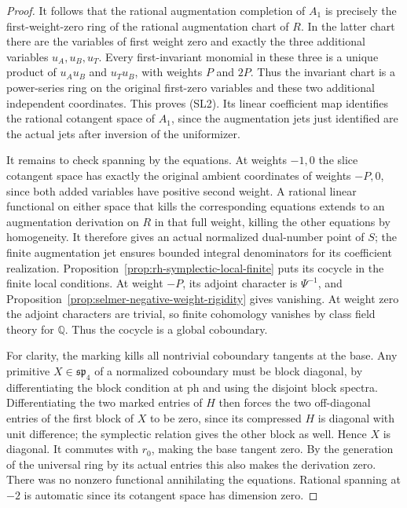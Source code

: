 \begin{proof}
It follows that the rational augmentation completion
of \(A_1\) is precisely the first-weight-zero ring
of the rational augmentation chart of \(R\).
In the latter chart there are the variables of
first weight zero and exactly the three additional
variables \(u_A,u_B,u_T\).
Every first-invariant monomial in these three is a
unique product of \(u_Au_B\) and \(u_Tu_B\), with
weights \(P\) and \(2P\).
Thus the invariant chart is a power-series ring on
the original first-zero variables and these two
additional independent coordinates. This proves (SL2).
Its linear coefficient map identifies the rational
cotangent space of \(A_1\), since the augmentation
jets just identified are the actual jets after
inversion of the uniformizer.

It remains to check spanning by the equations.
At weights \(-1,0\) the slice cotangent space
has exactly the original ambient coordinates of
weights \(-P,0\), since both added variables have
positive second weight. A rational linear functional
on either space that kills the corresponding equations
extends to an augmentation derivation on \(R\)
in that full weight, killing the other equations
by homogeneity. It therefore gives an actual normalized
dual-number point of \(S\); the finite augmentation
jet ensures bounded integral denominators for its
coefficient realization.
Proposition~\ref{prop:rh-symplectic-local-finite}
puts its cocycle in the finite local conditions.
At weight \(-P\), its adjoint character is
\(\Psi^{-1}\), and
Proposition~\ref{prop:selmer-negative-weight-rigidity}
gives vanishing. At weight zero the adjoint
characters are trivial, so finite cohomology
vanishes by class field theory for \(\mathbb Q\).
Thus the cocycle is a global coboundary.

For clarity, the marking kills all nontrivial
coboundary tangents at the base. Any primitive
\(X\in\mathfrak{sp}_4\) of a normalized
coboundary must be block diagonal, by differentiating
the block condition at \(\mathrm{ph}\) and using
the disjoint block spectra. Differentiating the two
marked entries of \(H\) then forces the two off-diagonal
entries of the first block of \(X\) to be zero,
since its compressed \(H\) is diagonal with
unit difference; the symplectic relation gives the
other block as well. Hence \(X\) is diagonal.
It commutes with \(r_0\), making the base tangent
zero. By the generation of the universal ring by
its actual entries this also makes the derivation zero.
There was no nonzero functional annihilating the
equations. Rational spanning at \(-2\) is automatic
since its cotangent space has dimension zero.
\end{proof}

